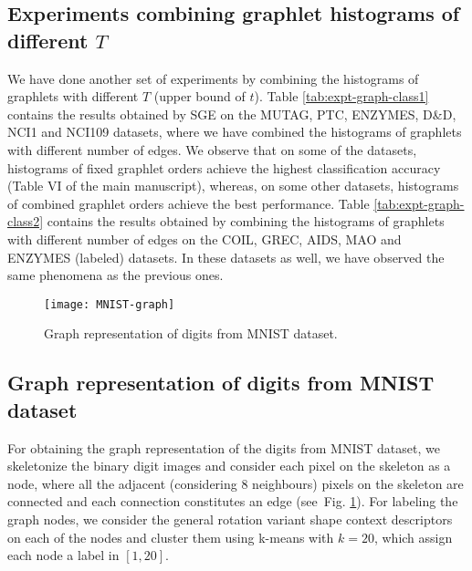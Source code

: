 \documentclass[journal]{IEEEtran}
\theoremstyle{definition}
\newcommand{\fig}[1]{Fig. \ref{#1}}
\newcommand{\tab}[1]{Table \ref{#1}}
\begin{document}
\subsection{Experiments combining graphlet histograms of different $T$}

We have done another set of experiments by combining the histograms of graphlets with different $T$ (upper bound of $t$). \tab{tab:expt-graph-class1} contains the results obtained by SGE on the MUTAG, PTC, ENZYMES, D\&D, NCI1 and NCI109 datasets, where we have combined the histograms of graphlets with different number of edges. We observe that on some of the datasets, histograms of fixed graphlet orders achieve the highest classification  accuracy (Table VI of the main manuscript), whereas, on  some other datasets, histograms of combined graphlet orders achieve the best performance. \tab{tab:expt-graph-class2} contains the results obtained by combining the histograms of graphlets with different number of edges on the COIL, GREC, AIDS, MAO and ENZYMES (labeled) datasets. In these datasets as well, we have observed the same phenomena as the previous ones.

\begin{figure}[!ht]
\begin{center}
\texttt{[image: MNIST-graph]}
\caption{Graph representation of digits from MNIST dataset.}
\label{fig:mnist-graph}
\end{center}
\end{figure}

\subsection{Graph representation of digits from MNIST dataset}
For obtaining the graph representation of the digits from MNIST dataset, we skeletonize the binary digit images and consider each pixel on the skeleton as a node, where all the adjacent (considering $8$ neighbours) pixels on the skeleton are connected and each connection constitutes an edge (see~\fig{fig:mnist-graph}). For labeling the graph nodes, we consider the general rotation variant shape context descriptors~\cite{Belongie2002} on each of the nodes and cluster them using k-means with $k=20$, which assign each node a label in $[1,20]$.

\end{document}
